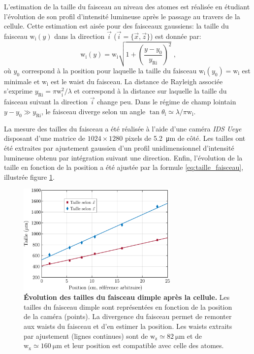 L'estimation de la taille du faisceau au niveau des atomes est réalisée en étudiant l'évolution de son profil d'intensité lumineuse après le passage au travers de la cellule. 
Cette estimation est aisée pour des faisceaux gaussiens: la taille du faisceau $\mathrm{w}_{\mathrm{i}}(y)$ dans la direction $\vec{i}$ ($\vec{i}= \lbrace \vec{x},\vec{z} \rbrace$) est donnée par:
\begin{equation}
\mathrm{w}_{\mathrm{i}}(y)=\mathrm{w}_{\mathrm{i}} \sqrt{1+\left( \frac{y-y_0}{y_{\mathrm{Ri}}} \right)^2} \text{ ,}
\label{eq:taille_faisceau}
\end{equation}
où $y_0$ correspond à la position pour laquelle la taille du faisceau $\mathrm{w}_{\mathrm{i}}(y_0)=\mathrm{w}_{\mathrm{i}}$ est minimale et $\mathrm{w}_{\mathrm{i}}$ est le waist du faisceau. La distance de Rayleigh associée s'exprime $y_{\mathrm{Ri}}=\pi \mathrm{w}_{\mathrm{i}}^2 / \lambda$ et correspond à la distance sur laquelle la taille du faisceau suivant la direction $\vec{i}$ change peu. Dans le régime de champ lointain $y-y_0 \gg y_{\mathrm{Ri}}$, le faisceau diverge selon un angle $\tan \theta_{\mathrm{i}} \simeq \lambda / \pi \mathrm{w}_{\mathrm{i}}$.

La mesure des tailles du faisceau a été réalisée à l'aide d'une caméra \emph{IDS Ueye} disposant d'une matrice de $1024 \times 1280$ pixels de \SI{5.2}{\micro\metre} de côté. Les tailles ont été extraites par ajustement gaussien d'un profil unidimensionnel d'intensité lumineuse obtenu par intégration suivant une direction. Enfin, l'évolution de la taille en fonction de la position a été ajustée par la formule \ref{eq:taille_faisceau}, illustrée figure \ref{fig:taille_dimple}.

\begin{figure}
\centering
\includegraphics[width=0.7\textwidth]{Fig/Modif_exp/expansion_dimple.pdf}
\caption{\textbf{Évolution des tailles du faisceau dimple après la cellule.} Les tailles du faisceau dimple sont représentées en fonction de la position de la caméra (points). La divergence du faisceau permet de remonter aux waists du faisceau et d'en estimer la position. Les waists extraits par ajustement (lignes continues) sont de $\mathrm{w_z}\simeq \SI{82}{\micro\metre}$ et de $\mathrm{w_x}\simeq \SI{160}{\micro\metre}$ et leur position est compatible avec celle des atomes.}
\label{fig:taille_dimple}
\end{figure}

